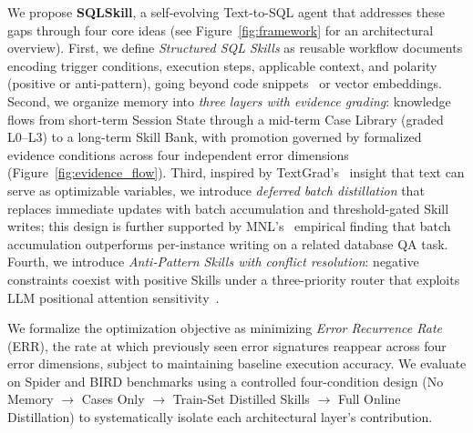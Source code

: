 We propose \textbf{SQLSkill}, a self-evolving Text-to-SQL agent that addresses these gaps through four core ideas (see Figure~\ref{fig:framework} for an architectural overview). 
First, we define \emph{Structured SQL Skills} as reusable workflow documents encoding trigger conditions, execution steps, applicable context, and polarity (positive or anti-pattern), going beyond code snippets~\cite{wang2023voyager} or vector embeddings. 
Second, we organize memory into \emph{three layers with evidence grading}: knowledge flows from short-term Session State through a mid-term Case Library (graded L0--L3) to a long-term Skill Bank, with promotion governed by formalized evidence conditions across four independent error dimensions (Figure~\ref{fig:evidence_flow}). 
Third, inspired by TextGrad's~\cite{yuksekgonul2024textgrad} insight that text can serve as optimizable variables, we introduce \emph{deferred batch distillation} that replaces immediate updates with batch accumulation and threshold-gated Skill writes; this design is further supported by MNL's~\cite{su2025mnl} empirical finding that batch accumulation outperforms per-instance writing on a related database QA task. 
Fourth, we introduce \emph{Anti-Pattern Skills with conflict resolution}: negative constraints coexist with positive Skills under a three-priority router that exploits LLM positional attention sensitivity~\cite{liu2024lostmiddle}.


We formalize the optimization objective as minimizing \emph{Error Recurrence Rate} (ERR), the rate at which previously seen error signatures reappear across four error dimensions, subject to maintaining baseline execution accuracy. We evaluate on Spider and BIRD benchmarks using a controlled four-condition design (No Memory $\to$ Cases Only $\to$ Train-Set Distilled Skills $\to$ Full Online Distillation) to systematically isolate each architectural layer's contribution.


